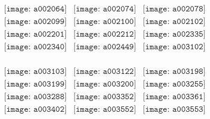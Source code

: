 \documentclass{article}
\begin{document}
\begin{figure}[H]
 \begin{center}$
 \begin{array}{cccc}
\texttt{[image: a002064]}&\texttt{[image: a002074]}&\texttt{[image: a002078]}\\\texttt{[image: a002099]}&\texttt{[image: a002100]}&\texttt{[image: a002102]}\\\texttt{[image: a002201]}&\texttt{[image: a002212]}&\texttt{[image: a002335]}\\\texttt{[image: a002340]}&\texttt{[image: a002449]}&\texttt{[image: a003102]}\\
\end{array}$
\end{center}
\end{figure}

\begin{figure}[H]
 \begin{center}$
 \begin{array}{cccc}
\texttt{[image: a003103]}&\texttt{[image: a003122]}&\texttt{[image: a003198]}\\\texttt{[image: a003199]}&\texttt{[image: a003200]}&\texttt{[image: a003255]}\\\texttt{[image: a003288]}&\texttt{[image: a003352]}&\texttt{[image: a003361]}\\\texttt{[image: a003402]}&\texttt{[image: a003552]}&\texttt{[image: a003553]}\\
\end{array}$
\end{center}
\end{figure}
\end{document}
